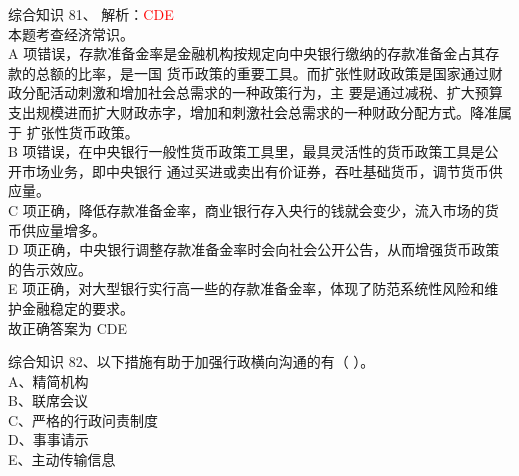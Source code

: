 \documentclass[aspectratio=169]{beamer}
\begin{document}
\begin{frame}[t]{综合知识}
    81、  解析：\textcolor{red}{CDE}\\
    {\scriptsize
    本题考查经济常识。\\
    A 项错误，存款准备金率是金融机构按规定向中央银行缴纳的存款准备金占其存款的总额的比率，是一国
    货币政策的重要工具。而扩张性财政政策是国家通过财政分配活动刺激和增加社会总需求的一种政策行为，主
    要是通过减税、扩大预算支出规模进而扩大财政赤字，增加和刺激社会总需求的一种财政分配方式。降准属于
    扩张性货币政策。\\
    B 项错误，在中央银行一般性货币政策工具里，最具灵活性的货币政策工具是公开市场业务，即中央银行
    通过买进或卖出有价证券，吞吐基础货币，调节货币供应量。\\
    C 项正确，降低存款准备金率，商业银行存入央行的钱就会变少，流入市场的货币供应量增多。\\
    D 项正确，中央银行调整存款准备金率时会向社会公开公告，从而增强货币政策的告示效应。\\
    E 项正确，对大型银行实行高一些的存款准备金率，体现了防范系统性风险和维护金融稳定的要求。\\
    故正确答案为 CDE\\
    }
\end{frame}                           

\begin{frame}[t]{综合知识}
    82、以下措施有助于加强行政横向沟通的有（ ）。 \\
    A、精简机构                                   \\
    B、联席会议                                   \\
    C、严格的行政问责制度                         \\
    D、事事请示                                   \\
    E、主动传输信息                               \\
\end{frame}                           
\end{document}
